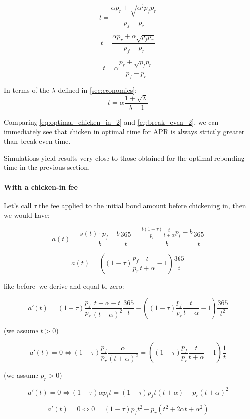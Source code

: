\documentclass{article}
\begin{document}
\[
t = \frac{\alpha p_r + \sqrt{\alpha^2 p_f p_r}}{p_f-p_r}
\]

\[
t = \frac{\alpha p_r + \alpha \sqrt{p_f p_r}}{p_f-p_r}
\]

\begin{equation}
  \label{eq:optimal_chicken_in_1}
t = \alpha \frac{p_r + \sqrt{p_f p_r}}{p_f-p_r}
\end{equation}

In terms of the $\lambda$ defined in \ref{sec:economics}:
\begin{equation}
  \label{eq:optimal_chicken_in_2}
t = \alpha \frac{1 + \sqrt{\lambda}}{\lambda - 1}
\end{equation}

Comparing \ref{eq:optimal_chicken_in_2} and \ref{eq:break_even_2}, we can immediately see that chicken in optimal time for APR is always strictly greater than break even time.

Simulations yield results very close to those obtained for the optimal rebonding time in the previous section.

\paragraph{With a chicken-in fee}
 Let’s call $\tau$ the fee applied to the initial bond amount before chickening in, then we would have:

\[
a(t) = \frac{s(t) \cdot p_f - b}{b} \frac{365}{t} = \frac{\frac{b(1-\tau)}{p_r} \frac{t}{t+\alpha} p_f - b}{b} \frac{365}{t}
\]

\begin{equation}
  \label{eq:apr}
a(t) = \left((1-\tau)\frac{p_f}{p_r} \frac{t}{t+\alpha} - 1\right) \frac{365}{t}
\end{equation}

like before, we derive and equal to zero:

\[
a'(t) = (1-\tau)\frac{p_f}{p_r} \frac{t + \alpha - t}{(t+\alpha)^2} \frac{365}{t} - \left((1-\tau)\frac{p_f}{p_r} \frac{t}{t+\alpha} - 1\right) \frac{365}{t^2}
\]

(we assume $t > 0$)

\[
a'(t) = 0 \iff (1-\tau)\frac{p_f}{p_r} \frac{\alpha}{(t+\alpha)^2} = \left((1-\tau)\frac{p_f}{p_r} \frac{t}{t+\alpha} - 1\right) \frac{1}{t}
\]

(we assume $p_r > 0$)

\[
a'(t) = 0 \iff (1-\tau) \alpha p_f t = (1-\tau) p_f t(t+\alpha)  - p_r(t+\alpha)^2
\]

\[
a'(t) = 0 \iff 0 = (1-\tau)p_f t^2 - p_r(t^2+2\alpha t+\alpha^2)
\]
\end{document}
